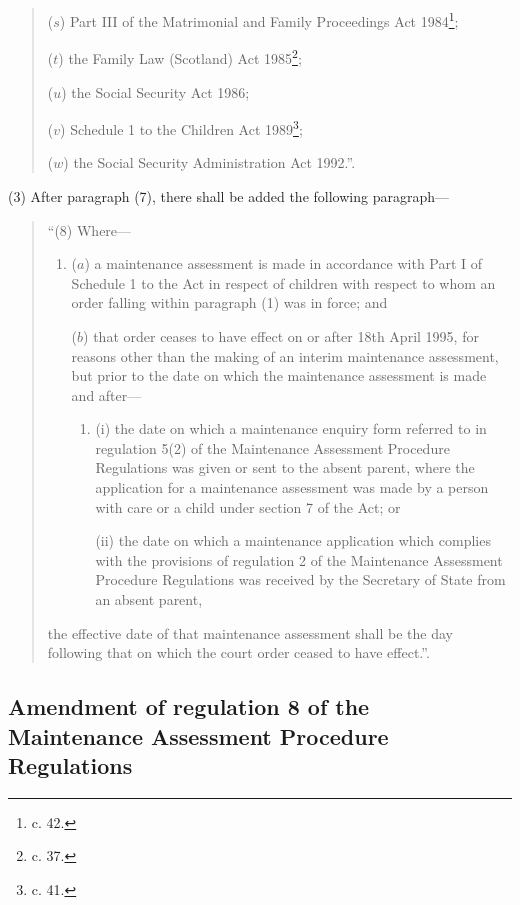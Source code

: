 \documentclass[12pt,a4paper]{article}
\begin{document}
\begin{quotation}
\begin{enumerate}
($s$) Part III of the Matrimonial and Family Proceedings Act 1984\footnote{ c. 42.};

($t$) the Family Law (Scotland) Act 1985\footnote{ c. 37.};

($u$) the Social Security Act 1986;

($v$) Schedule 1 to the Children Act 1989\footnote{ c. 41.};

($w$) the Social Security Administration Act 1992.”.
\end{enumerate}
\end{quotation}

(3) After paragraph (7), there shall be added the following paragraph—
\begin{quotation}
“(8) Where—
\begin{enumerate}\item[]
($a$) a maintenance assessment is made in accordance with Part I of Schedule 1 to the Act in respect of children with respect to whom an order falling within paragraph (1) was in force; and

($b$) that order ceases to have effect on or after 18th April 1995, for reasons other than the making of an interim maintenance assessment, but prior to the date on which the maintenance assessment is made and after—
\begin{enumerate}\item[]
(i) the date on which a maintenance enquiry form referred to in regulation 5(2) of the Maintenance Assessment Procedure Regulations was given or sent to the absent parent, where the application for a maintenance assessment was made by a person with care or a child under section 7 of the Act; or

(ii) the date on which a maintenance application which complies with the provisions of regulation 2 of the Maintenance Assessment Procedure Regulations was received by the Secretary of State from an absent parent,
\end{enumerate}
\end{enumerate}
the effective date of that maintenance assessment shall be the day following that on which the court order ceased to have effect.”.
\end{quotation}

\subsection[28. Amendment of regulation 8 of the Maintenance Assessment Procedure Regulations]{\sloppy Amendment of regulation 8 of the Maintenance Assessment Procedure Regulations}
\end{document}
